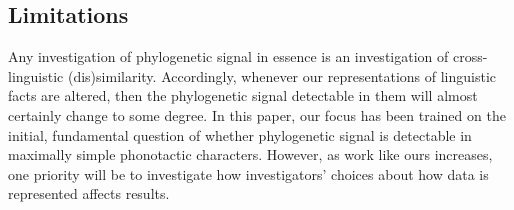 \hypertarget{phylo-sig-limitations}{%
\subsection{Limitations}\label{phylo-sig-limitations}}

Any investigation of phylogenetic signal in essence is an investigation of cross-linguistic (dis)similarity. Accordingly, whenever our representations of linguistic facts are altered, then the phylogenetic signal detectable in them will almost certainly change to some degree. In this paper, our focus has been trained on the initial, fundamental question of whether phylogenetic signal is detectable in maximally simple phonotactic characters. However, as work like ours increases, one priority will be to investigate how investigators' choices about how data is represented affects results.

